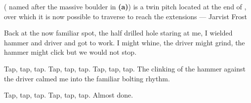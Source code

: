 \begin{pagefigure}
\begin{subfigure}[t]{0.49\textwidth}
\caption{}
\end{subfigure}
\caption{\protect{} ( named after the massive boulder in \textbf{(a)}) is a twin pitch located at the end of \protect{}, over which it is now possible to traverse to reach the \protect{} extensions --- Jarvist Frost}
\label{none}
\end{pagefigure}

Back at the now familiar spot, the half drilled hole staring at me, I wielded hammer and driver and got to work. I might whine, the driver might grind, the hammer might click but we would not stop. 

Tap, tap, tap. Tap, tap, tap. Tap, tap, tap. The clinking of the hammer against the driver calmed me into the familiar bolting rhythm. 

Tap, tap, tap. Tap, tap, tap. Almost done. 

